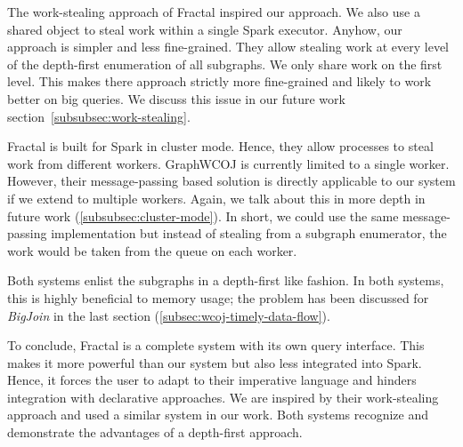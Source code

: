 The work-stealing approach of Fractal inspired our approach.
We also use a shared object to steal work within a single Spark executor.
Anyhow, our approach is simpler and less fine-grained.
They allow stealing work at every level of the depth-first enumeration of all subgraphs.
We only share work on the first level.
This makes there approach strictly more fine-grained and likely to work better on big
queries.
We discuss this issue in our future work section~\ref{subsubsec:work-stealing}.

Fractal is built for Spark in cluster mode.
Hence, they allow processes to steal work from different workers.
GraphWCOJ is currently limited to a single worker.
However, their message-passing based solution is directly applicable to our system if
we extend to multiple workers.
Again, we talk about this in more depth in future work (\ref{subsubsec:cluster-mode}).
In short, we could use the same message-passing implementation but instead of stealing
from a subgraph enumerator, the work would be taken from the queue on each worker.

Both systems enlist the subgraphs in a depth-first like fashion.
In both systems, this is highly beneficial to memory usage;
the problem has been discussed for \textit{BigJoin} in the last section (\ref{subsec:wcoj-timely-data-flow}).

To conclude, Fractal is a complete system with its own query interface.
This makes it more powerful than our system but also less integrated into Spark.
Hence, it forces the user to adapt to their imperative language and hinders
integration with declarative approaches.
We are inspired by their work-stealing approach and used a similar system in our work.
Both systems recognize and demonstrate the advantages of a depth-first approach.


